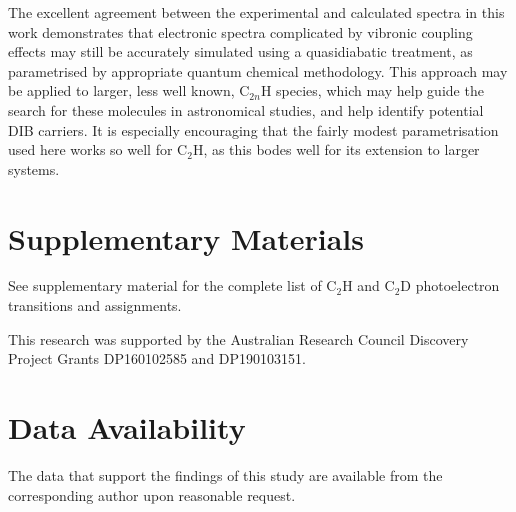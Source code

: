 \documentclass[aip,graphicx]{revtex4-1}
\begin{document}
The excellent agreement between the experimental and calculated spectra in this work
demonstrates that electronic spectra complicated by vibronic coupling effects may still be accurately simulated using a quasidiabatic treatment, as parametrised by appropriate quantum chemical methodology. This approach may be applied to larger, less well known, C$_{2n}$H species, which may help guide the search for these molecules in astronomical studies, and help identify potential DIB carriers. It is especially encouraging that the fairly modest parametrisation used here works so well for C$_2$H, as this bodes well for its extension to larger systems.


\section*{Supplementary Materials}
See supplementary material for the complete list of C$_2$H and C$_2$D photoelectron transitions and assignments.


\begin{acknowledgments}
	This research was supported by the Australian Research Council Discovery
	Project Grants DP160102585 and DP190103151.  
\end{acknowledgments}

\section*{Data Availability}
The data that support the findings of this study are available from the corresponding author upon reasonable request.


\end{document}
